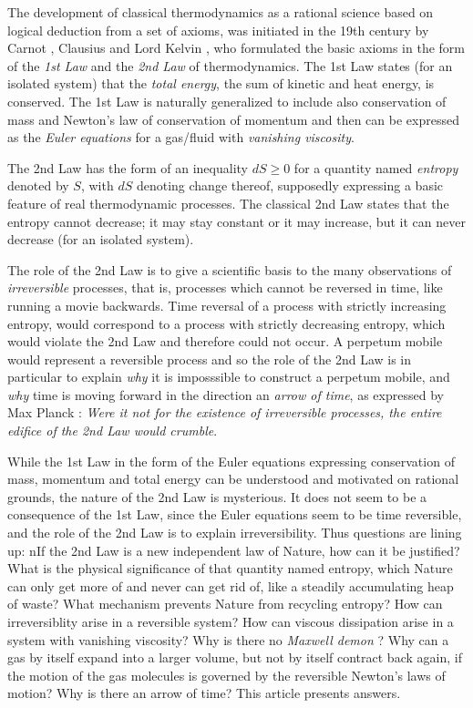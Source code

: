The development of classical thermodynamics as a rational science
based on logical deduction from a set of axioms, was initiated in the
19th century by Carnot \cite{carnot}, Clausius \cite{clausius} and
Lord Kelvin \cite{kelvin}, who formulated the basic axioms in the form
of the \emph{1st Law} and the \emph{2nd Law} of thermodynamics. The
1st Law states (for an isolated system) that the \emph{total energy},
the sum of kinetic and heat energy, is conserved.  The 1st Law is
naturally generalized to include also conservation of mass and
Newton's law of conservation of momentum and then can be expressed as
the \emph{Euler equations} for a gas/fluid with \emph{vanishing
viscosity}.

The 2nd Law has the form of an inequality $dS\ge 0$ for a quantity
named \emph{entropy} denoted by $S$, with $dS$ denoting change
thereof, supposedly expressing a basic feature of real thermodynamic
processes.  The classical 2nd Law states that the entropy cannot
decrease; it may stay constant or it may increase, but it can never
decrease (for an isolated system).

The role of the 2nd Law is to give a scientific basis to the many
observations of \emph{irreversible} processes, that is, processes
which cannot be reversed in time, like running a movie backwards.
Time reversal of a process with strictly increasing entropy, would
correspond to a process with strictly decreasing entropy, which would
violate the 2nd Law and therefore could not occur. A perpetum mobile
would represent a reversible process and so the role of the 2nd Law is
in particular to explain \emph{why} it is imposssible to construct a
perpetum mobile, and \emph{why} time is moving forward in the
direction an \emph{arrow of time}, as expressed by Max Planck
\cite{planck1,planck2,planck3}: \emph{Were it not for the existence of
irreversible processes, the entire edifice of the 2nd Law would
crumble}.

While the 1st Law in the form of the Euler equations expressing
conservation of mass, momentum and total energy can be understood and
motivated on rational grounds, the nature of the 2nd Law is
mysterious.  It does not seem to be a consequence of the 1st Law,
since the Euler equations seem to be time reversible, and the role of
the 2nd Law is to explain irreversibility. Thus questions are lining
up: nIf the 2nd Law is a new independent law of Nature, how can it be
justified? What is the physical significance of that quantity named
entropy, which Nature can only get more of and never can get rid of,
like a steadily accumulating heap of waste? What mechanism prevents
Nature from recycling entropy? How can irreversiblity arise in a
reversible system? How can viscous dissipation arise in a system with
vanishing viscosity? Why is there no \emph{Maxwell demon}
\cite{maxwell}?  Why can a gas by itself expand into a larger volume,
but not by itself contract back again, if the motion of the gas
molecules is governed by the reversible Newton's laws of motion? Why
is there an arrow of time? This article presents answers.

